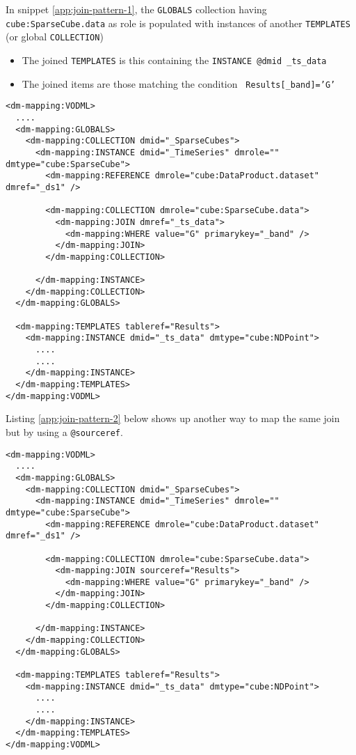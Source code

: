 
In snippet \ref{app:join-pattern-1}, the \texttt{GLOBALS} collection having \texttt{cube:SparseCube.data} as role is populated with  instances of another \texttt{TEMPLATES} (or global \texttt{COLLECTION})
\begin{itemize}
  \item The joined \texttt{TEMPLATES} is this containing the  \texttt{INSTANCE \texttt{@dmid} \_ts\_data}
  \item The joined items are those matching the condition  \texttt{ Results[\_band]='G'}
\end{itemize}

\begin{lstlisting}[frame=single,label={app:join-pattern-1},caption={Joining a global \texttt{COLLECTION} with a \texttt{TEMPLATES}  identified by a \texttt{@dmid} \texttt{@dmref} pair},style=XML,basicstyle=\tiny]
<dm-mapping:VODML>
  ....
  <dm-mapping:GLOBALS>
    <dm-mapping:COLLECTION dmid="_SparseCubes">
      <dm-mapping:INSTANCE dmid="_TimeSeries" dmrole="" dmtype="cube:SparseCube">
        <dm-mapping:REFERENCE dmrole="cube:DataProduct.dataset" dmref="_ds1" />
        
        <dm-mapping:COLLECTION dmrole="cube:SparseCube.data">
          <dm-mapping:JOIN dmref="_ts_data">
            <dm-mapping:WHERE value="G" primarykey="_band" />
          </dm-mapping:JOIN>
        </dm-mapping:COLLECTION>
        
      </dm-mapping:INSTANCE>
    </dm-mapping:COLLECTION>
  </dm-mapping:GLOBALS>

  <dm-mapping:TEMPLATES tableref="Results">
    <dm-mapping:INSTANCE dmid="_ts_data" dmtype="cube:NDPoint">
      ....
      ....
    </dm-mapping:INSTANCE>
  </dm-mapping:TEMPLATES>
</dm-mapping:VODML>
\end{lstlisting}  

Listing \ref{app:join-pattern-2} below shows up another way to map the same join but by using a \texttt{@sourceref}.

\begin{lstlisting}[frame=single,label={app:join-pattern-2},caption={Joining a global \texttt{COLLECTION} with a \texttt{TEMPLATES}  identified by a @sourceref},style=XML,basicstyle=\tiny]
<dm-mapping:VODML>
  ....
  <dm-mapping:GLOBALS>
    <dm-mapping:COLLECTION dmid="_SparseCubes">
      <dm-mapping:INSTANCE dmid="_TimeSeries" dmrole="" dmtype="cube:SparseCube">
        <dm-mapping:REFERENCE dmrole="cube:DataProduct.dataset" dmref="_ds1" />
        
        <dm-mapping:COLLECTION dmrole="cube:SparseCube.data">
          <dm-mapping:JOIN sourceref="Results">
            <dm-mapping:WHERE value="G" primarykey="_band" />
          </dm-mapping:JOIN>
        </dm-mapping:COLLECTION>
        
      </dm-mapping:INSTANCE>
    </dm-mapping:COLLECTION>
  </dm-mapping:GLOBALS>

  <dm-mapping:TEMPLATES tableref="Results">
    <dm-mapping:INSTANCE dmid="_ts_data" dmtype="cube:NDPoint">
      ....
      ....
    </dm-mapping:INSTANCE>
  </dm-mapping:TEMPLATES>
</dm-mapping:VODML>
\end{lstlisting}  

